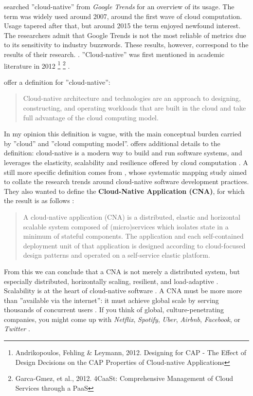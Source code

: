 \documentclass[utf8,english]{gradu3}
\begin{document}
\textcite[8]{Kratzke2017} searched ''cloud-native'' from \textit{Google Trends}
for an overview of its usage. The term was widely used around 2007, around the
first wave of cloud computation. Usage tapered after that, but around 2015 the
term enjoyed newfound interest. The researchers admit that Google Trends is not
the most reliable of metrics due to its sensitivity to industry buzzwords. These
results, however, correspond to the results of their research.
\textcite[8]{Kratzke2017}. ''Cloud-native'' was first mentioned in academic
literature in 2012 \footnote{Andrikopoulos, Fehling \& Leymann, 2012. Designing
  for CAP - The Effect of Design Decisions on the CAP Properties of Cloud-native
  Applications} \footnote{Garca-Gmez, et al., 2012. 4CaaSt: Comprehensive
  Management of Cloud Services through a PaaS} .

\textcite{Microsoft2022-CNA} offer a definition for ''cloud-native'':

\begin{quote} Cloud-native architecture and technologies are an approach to
  designing, constructing, and operating workloads that are built in the cloud and
  take full advantage of the cloud computing model.
\end{quote}

In my opinion this definition is vague, with the main conceptual burden carried
by ''cloud'' and ''cloud computing model''. \textcite{Patrizio2018} offers
additional details to the definition: cloud-native is a modern way to build and
run software systems, and leverages the elasticity, scalability and resilience
offered by cloud computation \parencite{Patrizio2018}. A still more specific
definition comes from \textcite{Kratzke2017}, whose systematic mapping study
aimed to collate the research trends around cloud-native software development
practices. They also wanted to define the \textbf{Cloud-Native Application
  (CNA)}, for which the result is as follows \parencite[13]{Kratzke2017}:

\begin{quote}
  A cloud-native application (CNA) is a distributed, elastic and horizontal
  scalable system composed of (micro)services which isolates state in a minimum
  of stateful components. The application and each self-contained deployment
  unit of that application is designed according to cloud-focused design
  patterns and operated on a self-service elastic platform.
\end{quote}

From this we can conclude that a CNA is not merely a distributed system, but
especially distributed, horizontally scaling, resilient, and load-adaptive
\parencite[13]{Kratzke2017}. Scalability is at the heart of cloud-native
software \parencite{CNAF2018}. A CNA must be more more than ''available via the
internet'': it must achieve global scale by serving thousands of concurrent
users \parencite[17]{Gannon2017}. If you think of global, culture-penetrating
companies, you might come up with \textit{Netflix}, \textit{Spotify},
\textit{Uber}, \textit{Airbnb}, \textit{Facebook}, or \textit{Twitter}
\parencites{Gannon2017}{Patrizio2018}.
\end{document}
